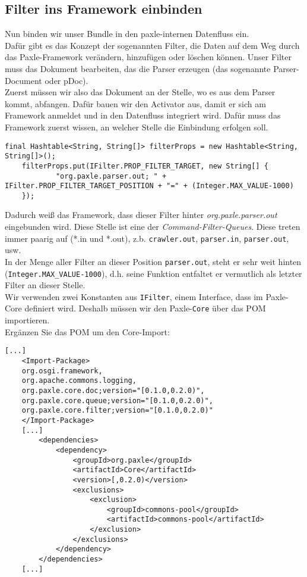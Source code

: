 \documentclass[a4paper,12pt]{scrartcl}
\begin{document}
\subsection{Filter ins Framework einbinden}
Nun binden wir unser Bundle in den paxle-internen Datenfluss ein.\\
Dafür gibt es das Konzept der sogenannten Filter, die Daten auf dem Weg durch das Paxle-Framework verändern, hinzufügen oder löschen können. Unser Filter muss das Dokument bearbeiten, das die Parser erzeugen (das sogenannte Parser-Document oder pDoc).\\
Zuerst müssen wir also das Dokument an der Stelle, wo es aus dem Parser kommt, abfangen. Dafür bauen wir den Activator aus, damit er sich am Framework anmeldet und in den Datenfluss integriert wird. Dafür muss das Framework zuerst wissen, an welcher Stelle die Einbindung erfolgen soll.
\begin{lstlisting}[caption=Quellcode zum Einfügen in die \lstinline|start(BundleContext context)|-Methode des Activators]
	final Hashtable<String, String[]> filterProps = new Hashtable<String, String[]>();
	filterProps.put(IFilter.PROP_FILTER_TARGET, new String[] {
			"org.paxle.parser.out; " + IFilter.PROP_FILTER_TARGET_POSITION + "=" + (Integer.MAX_VALUE-1000)
	});
\end{lstlisting}
Dadurch weiß das Framework, dass dieser Filter hinter \emph{org.paxle.parser.out} eingebunden wird. Diese Stelle ist eine der \emph{Command-Filter-Queues}. Diese treten immer paarig auf (*.in und *.out), z.b. \lstinline[breaklines=false, basicstyle=\itshape]|crawler.out|, \lstinline[breaklines=false, basicstyle=\itshape]|parser.in|, \lstinline[breaklines=false, basicstyle=\itshape]|parser.out|, usw.\\
In der Menge aller Filter an dieser Position \lstinline[breaklines=false, basicstyle=\itshape]|parser.out|, steht er sehr weit hinten (\lstinline[breaklines=false, basicstyle=\itshape]|Integer.MAX_VALUE-1000|), d.h. seine Funktion entfaltet er vermutlich als letzter Filter an dieser Stelle.\\
Wir verwenden zwei Konstanten aus \lstinline[breaklines=false, basicstyle=\itshape]|IFilter|, einem Interface, dass im Paxle-Core definiert wird. Deshalb müssen wir den Paxle-\lstinline[breaklines=false, basicstyle=\itshape]|Core| über das POM importieren. \\
Ergänzen Sie das POM um den Core-Import:
\begin{lstlisting}[caption=Zusätzliche Imports und Dependencies im pom.xml]
	[...]
	<Import-Package>
	org.osgi.framework,
	org.apache.commons.logging,
	org.paxle.core.doc;version="[0.1.0,0.2.0)",
	org.paxle.core.queue;version="[0.1.0,0.2.0)",
	org.paxle.core.filter;version="[0.1.0,0.2.0)"
	</Import-Package>
	[...]
		<dependencies>
			<dependency>
				<groupId>org.paxle</groupId>
				<artifactId>Core</artifactId>
				<version>[,0.2.0)</version>
				<exclusions>
					<exclusion>
						<groupId>commons-pool</groupId>
						<artifactId>commons-pool</artifactId>
					</exclusion>
				</exclusions>				
			</dependency>
		</dependencies>
	[...]
	\end{lstlisting}
\end{document}
